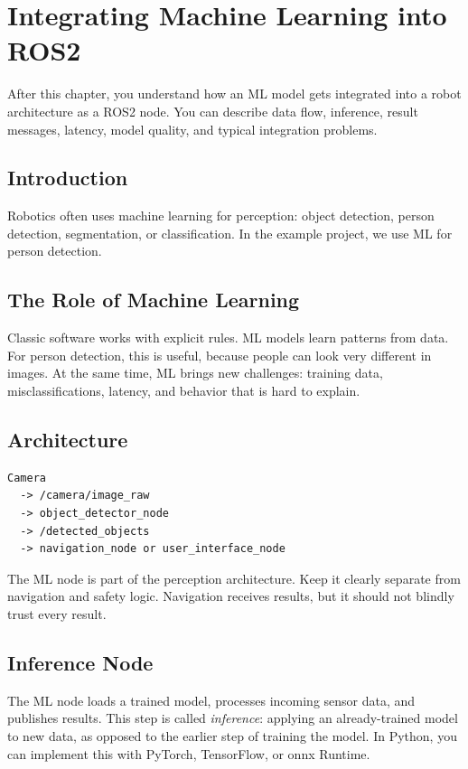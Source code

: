 \chapter{Integrating Machine Learning into ROS2}

\begin{lernziele}
After this chapter, you understand how an ML model gets integrated into a robot architecture as a ROS2 node. You can describe data flow, inference, result messages, latency, model quality, and typical integration problems.
\end{lernziele}

\section{Introduction}
Robotics often uses machine learning for perception: object detection, person detection, segmentation, or classification. In the example project, we use ML for person detection.

\section{The Role of Machine Learning}
Classic software works with explicit rules. ML models learn patterns from data. For person detection, this is useful, because people can look very different in images. At the same time, ML brings new challenges: training data, misclassifications, latency, and behavior that is hard to explain.

\section{Architecture}
\begin{lstlisting}[style=plaintext]
Camera
  -> /camera/image_raw
  -> object_detector_node
  -> /detected_objects
  -> navigation_node or user_interface_node
\end{lstlisting}

The ML node is part of the perception architecture. Keep it clearly separate from navigation and safety logic. Navigation receives results, but it should not blindly trust every result.

\section{Inference Node}
The ML node loads a trained model, processes incoming sensor data, and publishes results. This step is called \emph{inference}: applying an already-trained model to new data, as opposed to the earlier step of training the model. In Python, you can implement this with PyTorch, TensorFlow, or \gls{onnx} Runtime.

